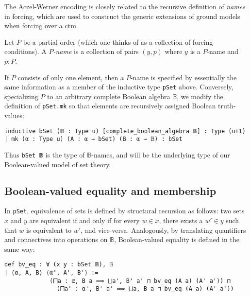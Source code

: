 \documentclass[a4paper,USenglish,cleveref, autoref]{lipics-v2019}
\newcommand{\B}{\mathbb{B}}
\newcommand{\lil}{\lstinline}
\begin{document}
The Aczel-Werner encoding is closely related to the recursive definition of \emph{names} in forcing, which are used to construct the generic extensions of ground models when forcing over a ctm.

\begin{definition}\label{def-p-name}
Let $P$ be a partial order (which one thinks of as a collection of forcing conditions). A \emph{$P$-name} is a collection of pairs $(y, p)$ where $y$ is a $P$-name and $p : P$.
\end{definition}

 If $P$ consists of only one element, then a $P$-name is specified by essentially the same information as a member of the inductive type \lstinline{pSet} above. Conversely, specializing $P$ to an arbitrary complete Boolean algebra $\B$, we modify the definition of \lstinline{pSet.mk} so that elements are recursively assigned Boolean truth-values:
\begin{lstlisting}
inductive bSet (𝔹 : Type u) [complete_boolean_algebra 𝔹] : Type (u+1)
| mk (α : Type u) (A : α → bSet) (B : α → 𝔹) : bSet
\end{lstlisting}
Thus \lil{bSet 𝔹} is the type of $\B$-names, and will be the underlying type of our Boolean-valued model of set theory.

\subsection{Boolean-valued equality and membership}

In \lil{pSet}, equivalence of sets is defined by structural recursion as follows: two sets $x$ and $y$ are equivalent if and only if for every $w \in x$, there exists a $w' \in y$ such that $w$ is equivalent to $w'$, and vice-versa. Analogously, by translating quantifiers and connectives into operations on $\B$, Boolean-valued equality is defined in the same way:
\begin{lstlisting}
def bv_eq : ∀ (x y : bSet 𝔹), 𝔹
| ⟨α, A, B⟩ ⟨α', A', B'⟩ :=
             (⨅a : α, B a ⟹ ⨆a', B' a' ⊓ bv_eq (A a) (A' a')) ⊓
               (⨅a' : α', B' a' ⟹ ⨆a, B a ⊓ bv_eq (A a) (A' a'))
\end{lstlisting}
\end{document}
